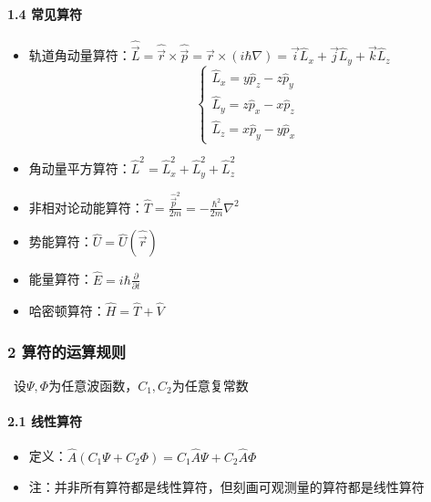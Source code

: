 \documentclass[UTF8,twocolumn]{ctexart}
\providecommand{\tightlist}{%
  \setlength{\itemsep}{0pt}\setlength{\parskip}{0pt}}
\let\oldparagraph\paragraph
\renewcommand{\paragraph}[1]{\oldparagraph{#1}\mbox{}}
\begin{document}
\hypertarget{ux5e38ux89c1ux7b97ux7b26}{%
\paragraph{ 1.4 常见算符}\label{ux5e38ux89c1ux7b97ux7b26}}

\begin{itemize}
\tightlist
\item
  轨道角动量算符：\(\hat{\vec{L}}=\hat{\vec{r}}\times\hat{\vec{p}}=\vec{r}\times(i\hbar\nabla)=\vec{i}\hat{L}_x+\vec{j}\hat{L}_y+\vec{k}\hat{L}_z\)
  \[\begin{cases} 
    \hat{L}_x=y\hat{p}_z-z\hat{p}_y\\
    \hat{L}_y=z\hat{p}_x-x\hat{p}_z\\
    \hat{L}_z=x\hat{p}_y-y\hat{p}_x
  \end{cases}\]
\item
  角动量平方算符：\(\hat{L}^2=\hat{L}_x^2+\hat{L}_y^2+\hat{L}_z^2\)
\item
  非相对论动能算符：\(\hat{T}=\frac{\hat{\vec{p}}^2}{2m}=-\frac{\hbar^2}{2m}\nabla^2\)
\item
  势能算符：\(\hat{U}=\hat{U}(\hat{\vec{r}})\)
\item
  能量算符：\(\hat{E}=i\hbar\frac{\partial}{\partial t}\)
\item
  哈密顿算符：\(\hat{H}=\hat{T}+\hat{V}\)
\end{itemize}

\hypertarget{ux7b97ux7b26ux7684ux8fd0ux7b97ux89c4ux5219}{%
\subsubsection{2
算符的运算规则}\label{ux7b97ux7b26ux7684ux8fd0ux7b97ux89c4ux5219}}

 设\(\Psi,\Phi\)为任意波函数，\(C_1,C_2\)为任意复常数

\hypertarget{ux7ebfux6027ux7b97ux7b26}{%
\paragraph{ 2.1 线性算符}\label{ux7ebfux6027ux7b97ux7b26}}

\begin{itemize}
\tightlist
\item
  定义：\(\hat{A}(C_1\Psi+C_2\Phi)=C_1\hat{A}\Psi+C_2\hat{A}\Phi\)
\item
  注：并非所有算符都是线性算符，但刻画可观测量的算符都是线性算符
\end{itemize}
\end{document}
